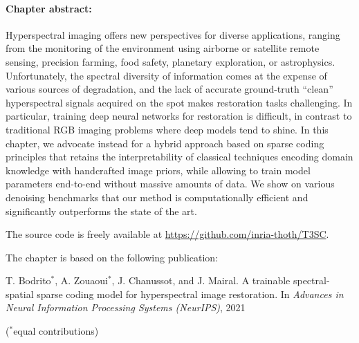 \begin{tcolorbox}[colback=gray!5!white,colframe=gray!75!black]

        \paragraph{Chapter abstract:}
        Hyperspectral imaging offers new perspectives for diverse applications, ranging from the  monitoring of the environment using airborne or satellite remote sensing, precision farming, food safety, planetary exploration, or astrophysics. 
        Unfortunately, the spectral diversity of information comes at the expense of various sources of degradation, and the lack of accurate ground-truth ``clean” hyperspectral signals acquired on the spot makes restoration tasks challenging.
        In particular, training deep neural networks for restoration is difficult, in contrast to traditional RGB imaging problems where deep models tend to shine. 
        In this chapter, we advocate instead for a hybrid approach based on sparse coding principles that retains the interpretability of classical techniques encoding domain knowledge with handcrafted
        image priors, while allowing to train model parameters end-to-end without massive
        amounts of data.
        We show on various denoising benchmarks that our method is computationally efficient and significantly outperforms the state of the art.

        \vspace{1em}
        The source code is freely available at \href{https://github.com/inria-thoth/T3SC}{https://github.com/inria-thoth/T3SC}.
        
        \vspace{1em}
        The chapter is based on the following publication:

        \vspace{0.5em}

        T. Bodrito$^{*}$, A. Zouaoui$^{*}$, J. Chanussot, and J. Mairal. A trainable spectral-spatial sparse coding model for hyperspectral image restoration. In \emph{Advances in Neural Information Processing Systems (NeurIPS)}, 2021

        \vspace{0.5em}

        ($^{*}$equal contributions)
    \end{tcolorbox}


